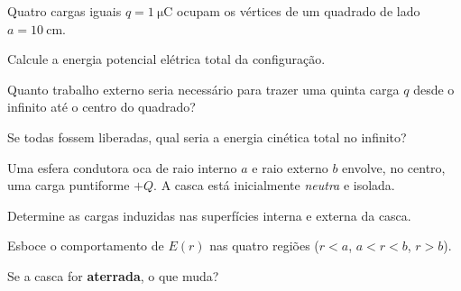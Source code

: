 \blocodesafio
\begin{questao}[4]{}

Quatro cargas iguais $q=\SI{1}{\micro\coulomb}$ ocupam os vértices de um quadrado
de lado $a=\SI{10}{\centi\meter}$.
\begin{itensq}
\item Calcule a energia potencial elétrica total da configuração.
\item Quanto trabalho externo seria necessário para trazer uma quinta carga $q$
      desde o infinito até o centro do quadrado?
\item Se todas fossem liberadas, qual seria a energia cinética total no infinito?
\end{itensq}


\end{questao}
\begin{questao}[4]{}

Uma esfera condutora oca de raio interno $a$ e raio externo $b$ envolve, no
centro, uma carga puntiforme $+Q$. A casca está inicialmente \emph{neutra} e
isolada.
\begin{itensq}
\item Determine as cargas induzidas nas superfícies interna e externa da casca.
\item Esboce o comportamento de $E(r)$ nas quatro regiões ($r<a$, $a<r<b$,
      $r>b$).
\item Se a casca for \textbf{aterrada}, o que muda?
\end{itensq}


\end{questao}

